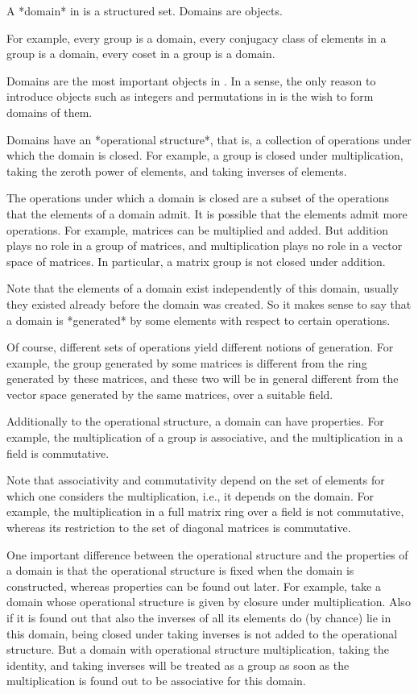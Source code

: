 
A *domain* in {\GAP} is a structured set.
Domains are objects.

For example, every group is a domain, every conjugacy class of elements
in a group is a domain, every coset in a group is a domain.

Domains are the most important objects in {\GAP}.
In a sense, the only reason to introduce objects such as integers and
permutations in {\GAP} is the wish to form domains of them.

Domains have an *operational structure*,
that is, a collection of operations under which the domain is closed.
For example, a group is closed under multiplication,
taking the zeroth power of elements, and taking inverses of elements.

The operations under which a domain is closed are a subset of
the operations that the elements of a domain admit.
It is possible that the elements admit more operations.
For example, matrices can be multiplied and added.
But addition plays no role in a group of matrices,
and multiplication plays no role in a vector space of matrices.
In particular, a matrix group is not closed under addition.

Note that the elements of a domain exist independently of this domain,
usually they existed already before the domain was created.
So it makes sense to say that a domain is *generated* by some elements
with respect to certain operations.

Of course, different sets of operations yield different notions of
generation.
For example, the group generated by some matrices is different from
the ring generated by these matrices, and these two will be in general
different from the vector space generated by the same matrices,
over a suitable field.

Additionally to the operational structure,
a domain can have properties.
For example, the multiplication of a group is associative,
and the multiplication in a field is commutative.

Note that associativity and commutativity depend on the set of
elements for which one considers the multiplication,
i.e., it depends on the domain.
For example, the multiplication in a full matrix ring over a field
is not commutative, whereas its restriction to the set of diagonal
matrices is commutative.

One important difference between the operational structure and the
properties of a domain is that the operational structure is fixed when
the domain is constructed, whereas properties can be found out later.
For example, take a domain whose operational structure is given by
closure under multiplication.
Also if it is found out that also the inverses of all its elements
do (by chance) lie in this domain,
being closed under taking inverses is not added to the operational
structure.
But a domain with operational structure multiplication,
taking the identity, and taking inverses
will be treated as a group as soon as the multiplication is found out to
be associative for this domain.

